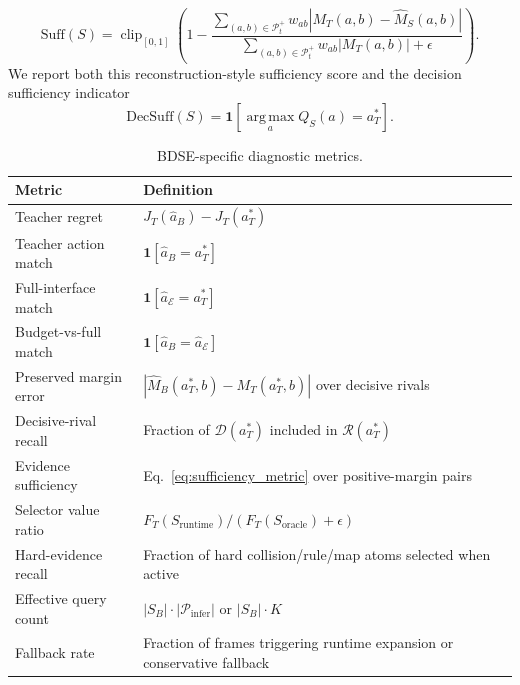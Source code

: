 \documentclass{article}
\newcommand{\E}{\mathcal{E}}
\newcommand{\R}{\mathcal{R}}
\newcommand{\argmax}{\operatorname*{arg\,max}}
\begin{document}
\begin{equation}
\mathrm{Suff}(S)=
\operatorname{clip}_{[0,1]}\left(
1-\frac{\sum_{(a,b)\in\mathcal P_t^+}w_{ab}|M_T(a,b)-\hat M_S(a,b)|}
{\sum_{(a,b)\in\mathcal P_t^+}w_{ab}|M_T(a,b)|+\epsilon}
\right).
\label{eq:sufficiency_metric}
\end{equation}
We report both this reconstruction-style sufficiency score and the decision sufficiency indicator
\begin{equation}
\mathrm{DecSuff}(S)=\mathbf 1[\argmax_a Q_S(a)=a_T^*].
\end{equation}

\begin{table}[h]
\centering
\caption{BDSE-specific diagnostic metrics.}
\label{tab:bdse_metrics}
\begin{tabular}{ll}
\toprule
Metric & Definition \\
\midrule
Teacher regret & $J_T(\hat a_B)-J_T(a_T^*)$ \\
Teacher action match & $\mathbf 1[\hat a_B=a_T^*]$ \\
Full-interface match & $\mathbf 1[\hat a_{\E}=a_T^*]$ \\
Budget-vs-full match & $\mathbf 1[\hat a_B=\hat a_{\E}]$ \\
Preserved margin error & $|\hat M_B(a_T^*,b)-M_T(a_T^*,b)|$ over decisive rivals \\
Decisive-rival recall & Fraction of $\mathcal D(a_T^*)$ included in $\R(a_T^*)$ \\
Evidence sufficiency & Eq.~\eqref{eq:sufficiency_metric} over positive-margin pairs \\
Selector value ratio & $F_T(S_{\mathrm{runtime}})/(F_T(S_{\mathrm{oracle}})+\epsilon)$ \\
Hard-evidence recall & Fraction of hard collision/rule/map atoms selected when active \\
Effective query count & $|S_B|\cdot |\mathcal P_{\mathrm{infer}}|$ or $|S_B|\cdot K$ \\
Fallback rate & Fraction of frames triggering runtime expansion or conservative fallback \\
\bottomrule
\end{tabular}
\end{table}
\end{document}

